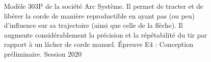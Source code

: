 \documentclass[
	11pt, %
	fleqn, %
	a4paper, %
]{LegrandOrangeBook}
\begin{document}
\begin{figure}[H] %
	\centering %
	\caption{Modèle 303P de la société Arc Système. Il permet de tracter et de libérer la corde de manière reproductible en ayant pas (ou peu) d’influence sur sa trajectoire (ainsi que celle de la flèche). Il augmente considérablement la précision et la répétabilité du tir par rapport à un lâcher de corde manuel. Épreuve E4 : Conception préliminaire. Session 2020}
	\label{ABTS1} %
\end{figure}
\end{document}
